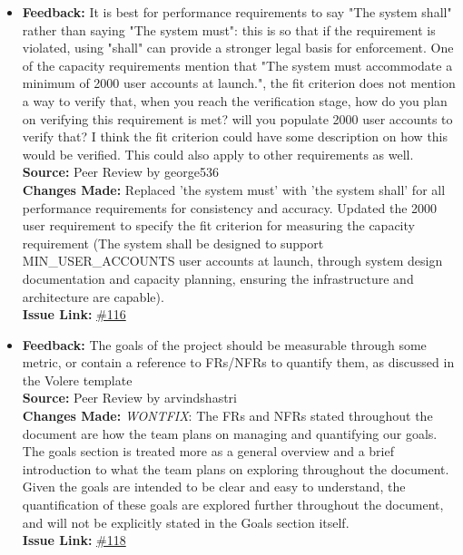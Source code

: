 \documentclass{article}
\begin{document}
\begin{itemize}
  \item 
    \textbf{Feedback:} It is best for performance requirements to say "The system shall" rather than saying "The system must": this is so that if the requirement is violated, using "shall" can provide a stronger legal basis for enforcement.
    One of the capacity requirements mention that "The system must accommodate a minimum of 2000 user accounts
    at launch.", the fit criterion does not mention a way to verify that, when you reach the verification stage, how do you plan on verifying this requirement is met? will you populate 2000 user accounts to verify that? I think the fit criterion could have some description on how this would be verified. This could also apply to other requirements as well.\\
    \textbf{Source:} Peer Review by george536\\
    \textbf{Changes Made:} Replaced 'the system must' with 'the system shall' for all performance requirements for consistency and accuracy. Updated the 2000 user requirement to specify the fit criterion for measuring the capacity requirement (The system shall be designed to support MIN\_USER\_ACCOUNTS user accounts at launch, through system design documentation and capacity planning, ensuring the infrastructure and architecture are capable). \\
    \textbf{Issue Link:} \href{https://github.com/parishanizam/TeleHealth/issues/116}{\#116}
  
  \item 
    \textbf{Feedback:} The goals of the project should be measurable through some metric, or contain a reference to FRs/NFRs to quantify them, as discussed in the Volere template \\
    \textbf{Source:} Peer Review by arvindshastri\\
    \textbf{Changes Made:} \textit{WONTFIX}: The FRs and NFRs stated throughout the document are how the team plans on managing and quantifying our goals. The goals section is treated more as a general overview and a brief introduction to what the team plans on exploring throughout the document. Given the goals are intended to be clear and easy to understand, the quantification of these goals are explored further throughout the document, and will not be explicitly stated in the Goals section itself.\\
    \textbf{Issue Link:} \href{https://github.com/parishanizam/TeleHealth/issues/118}{\#118}


\end{itemize}
\end{document}
